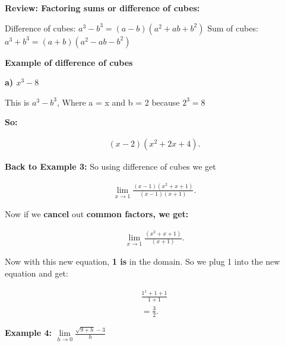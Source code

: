 \documentclass{report}
\begin{document}
   \pagebreak
   \begin{large}
      \noindent \textbf{Review: Factoring sums or difference of cubes:} 
   \end{large}

   \bigbreak \noindent \bigbreak \noindent 
   Difference of cubes: $a^3-b^3 = \left(a-b\right) \left(a^2+ab+b^2\right)$ 
   \bigbreak \noindent 
   Sum of cubes: $a^3+b^3 = \left(a+b\right) \left(a^2-ab-b^2\right)$

   \bigbreak \noindent \bigbreak \noindent 
   \begin{large}
      \noindent \textbf{Example of difference of cubes} 
   \end{large}
    
   \bigbreak \noindent 
   \textbf{a) $x^3-8$}

    \bigbreak \noindent 
    This is \textbf{$a^3-b^3$}, Where a = x and b = 2 because $2^3 = 8$

    \bigbreak \noindent 
    \textbf{So:}
 
    \begin{align*}
        \left(x-2\right) \left(x^2+2x+4\right)
    .\end{align*}
    
    \bigbreak \noindent 
    \textbf{Back to Example 3:}
    So using difference of cubes we get
    
    \begin{align*}
        \lim\limits_{x \to 1}{\frac{ \left(x-1\right) \left(x^2+x+1\right)}{ \left(x-1\right) \left(x+1\right)}} 
    .\end{align*}
    
    \bigbreak \noindent 
    \noindent Now if we \textbf{cancel} out \textbf{common factors, we get: }

    \begin{align*}
        \lim\limits_{x \to 1}{ \frac{ \left(x^2+x+1\right)}{ \left(x+1\right)}}
    .\end{align*}

    \bigbreak \noindent 
    Now with this new equation, \textbf{1 is} in the domain. So we plug 1 into the new equation and get:

    \begin{align*}
        \frac{1^1+1+1}{1+1} \\
        = \frac{3}{2}
    .\end{align*}

    \bigbreak \noindent \bigbreak \noindent  
    \begin{large}
        \textbf{Example 4: $\lim\limits_{h \to 0}{ \frac{\sqrt{9+h} -3}{h}}$ } 
    \end{large}
\end{document}

